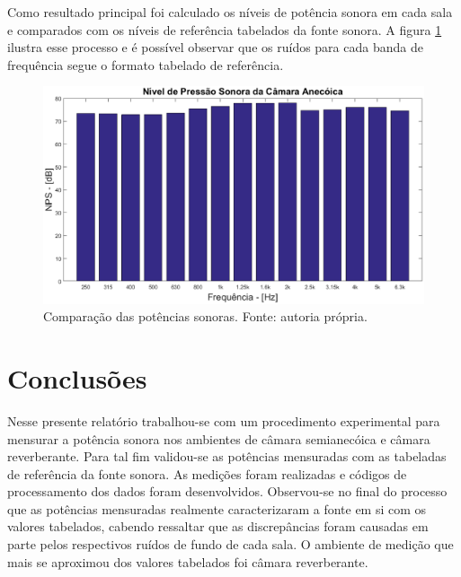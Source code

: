 \newpage
Como resultado principal foi calculado os níveis de potência sonora em cada sala e comparados com os níveis de referência tabelados da fonte sonora. A figura \ref{figura_8} ilustra esse processo e é possível observar que os ruídos para cada banda de frequência segue o formato tabelado de referência.
\begin{figure}[h!]
    \hspace{-4.5cm}
    \includegraphics[width=1.6\textwidth]{figuras/P_anecoica.eps}
    \caption{Comparação das potências sonoras. Fonte: autoria própria.}
    \label{figura_8}
\end{figure}

\chapter{Conclusões}\label{conclusoes}

Nesse presente relatório trabalhou-se com um procedimento experimental para mensurar a potência sonora nos ambientes de câmara semianecóica e câmara reverberante. Para tal fim validou-se as potências mensuradas com as tabeladas de referência da fonte sonora. As medições foram realizadas e códigos de processamento dos dados foram desenvolvidos. Observou-se no final do processo que as potências	mensuradas realmente caracterizaram a fonte em si com os valores tabelados, cabendo ressaltar que as discrepâncias foram causadas em parte pelos respectivos ruídos de fundo de cada sala. O ambiente de medição que mais se aproximou dos valores tabelados foi câmara reverberante.